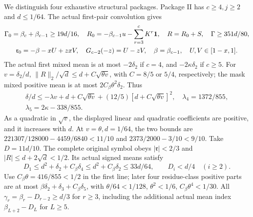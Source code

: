 We distinguish four exhaustive structural packages.
Package II has $c\ge4,j\ge2$ and $d\le1/64$.
The actual first-pair convolution gives
\[
\begin{gathered}
\Gamma_0=\beta_c+\beta_{c-1}\ge19d/16,\quad
R_0=-\beta_{c-1}u-\sum_{r=3}^cK^r\mathbf1,\quad
R=R_0+S,\quad\Gamma\ge351d/80,\\
\mathfrak r_0=-\beta-xU+zxV,\quad
G_{c-2}(-z)=U-zV,\quad\beta=\beta_{c-1},\quad U,V\in[1-x,1].
\end{gathered}
\]
The actual first mixed mean is at most $-2\delta_2$ if $c=4$,
and $-2\kappa\delta_2$ if $c\ge5$.
For $v=\delta_2/d$,
$\|R\|_2/\sqrt d\le d+C\sqrt{\theta v}$, with $C=8/5$ or $5/4$,
respectively; the mask mixed positive mean is at most
$2C_\beta\theta^2\delta_2$.
Thus
\[
\begin{gathered}
\delta/d\le-\lambda v+d+C\sqrt{\theta v}
+(12/5)[d+C\sqrt{\theta v}]^2,\quad \lambda_4=1372/855,\\
\lambda_5=2\kappa-338/855.
\end{gathered}
\]
As a quadratic in $\sqrt v$, the displayed linear and quadratic
coefficients are positive, and it increases with $d$.
At $v=\theta,d=1/64$, the two bounds are
$221307/128000-4459/6840<11/10$ and
$2373/2000-3/10<9/10$. Take $D=11d/10$.
The complete original symbol obeys $|\mathfrak r|<2/3$ and
$|R|\le d+2\sqrt d<1/2$. Its actual signed means satisfy
\begin{equation}\tag{R24.3.5}\label{eq:R24:IImeans}
D_1\le d^2+\delta_2+C_\beta\delta_4
\le d^2+C_\beta\delta_2\le33d/64,\qquad
D_i<d/4\quad(i\ge2).
\end{equation}
Use $C_\beta\theta=416/855<1/2$ in the first line; later four
residue-class positive parts are at most
$\beta\delta_2+\delta_3+C_\beta\delta_5$, with
$\theta/64<1/128$, $\theta^2<1/6$, $C_\beta\theta^4<1/30$.
All $\gamma_r=\beta_r-D_{r-2}\ge d/3$ for $r\ge3$, including the
additional actual mean index $\beta_{L+2}-D_L$ for $L\ge5$.

